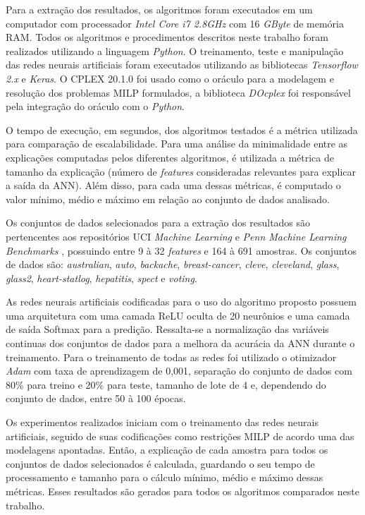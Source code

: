 Para a extração dos resultados, os algoritmos foram executados em um computador com processador \textit{Intel Core i7 2.8GHz} com 16 \textit{GByte} de memória RAM. Todos os algoritmos e procedimentos descritos neste trabalho foram realizados utilizando a linguagem \textit{Python}. O treinamento, teste e manipulação das redes neurais artificiais foram executados utilizando as bibliotecas \textit{Tensorflow 2.x} e \textit{Keras}. O CPLEX 20.1.0 foi usado como o oráculo para a modelagem e resolução dos problemas MILP formulados, a biblioteca \textit{DOcplex} foi responsável pela integração do oráculo com o \textit{Python}.


O tempo de execução, em segundos, dos algoritmos testados é a métrica utilizada para comparação de escalabilidade. Para uma análise da minimalidade entre as explicações computadas pelos diferentes algoritmos, é utilizada a métrica de tamanho da explicação (número de \textit{features} consideradas relevantes para explicar a saída da ANN). Além disso, para cada uma dessas métricas, é computado o valor mínimo, médio e máximo em relação ao conjunto de dados analisado.


Os conjuntos de dados selecionados para a extração dos resultados são pertencentes aos repositórios UCI \textit{Machine Learning} \cite{uci} e \textit{Penn Machine Learning Benchmarks} \cite{pennML}, possuindo entre 9 à 32 \textit{features} e 164 à 691 amostras. Os conjuntos de dados são: \textit{australian}, \textit{auto}, \textit{backache}, \textit{breast-cancer}, \textit{cleve}, \textit{cleveland}, \textit{glass}, \textit{glass2}, \textit{heart-statlog}, \textit{hepatitis}, \textit{spect} e \textit{voting}. 


As redes neurais artificiais codificadas para o uso do algoritmo proposto possuem uma arquitetura com uma camada  ReLU oculta de 20 neurônios e uma camada de saída Softmax para a predição. Ressalta-se a normalização das variáveis continuas dos conjuntos de dados para a melhora da acurácia da ANN durante o treinamento. Para o treinamento de todas as redes foi utilizado o otimizador \textit{Adam} com taxa de aprendizagem de 0,001, separação do conjunto de dados com 80\% para treino e 20\% para teste, tamanho de lote de 4 e, dependendo do conjunto de dados, entre 50 à 100 épocas. 


Os experimentos realizados iniciam com o treinamento das redes neurais artificiais, seguido de suas codificações como restrições MILP de acordo uma das modelagens apontadas. Então, a explicação de cada amostra para todos os conjuntos de dados selecionados é calculada, guardando o seu tempo de processamento e tamanho para o cálculo mínimo, médio e máximo dessas métricas. Esses resultados são gerados para todos os algoritmos comparados neste trabalho.
